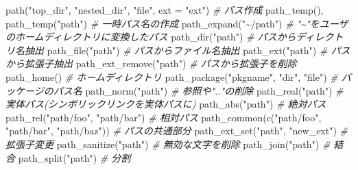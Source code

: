 \documentclass[
]{article}
\newenvironment{Shaded}{\begin{snugshade}}{\end{snugshade}}
\newcommand{\AttributeTok}[1]{\textcolor[rgb]{0.77,0.63,0.00}{#1}}
\newcommand{\CommentTok}[1]{\textcolor[rgb]{0.56,0.35,0.01}{\textit{#1}}}
\newcommand{\FunctionTok}[1]{\textcolor[rgb]{0.00,0.00,0.00}{#1}}
\newcommand{\NormalTok}[1]{#1}
\newcommand{\StringTok}[1]{\textcolor[rgb]{0.31,0.60,0.02}{#1}}
\begin{document}
\begin{Shaded}
\begin{Highlighting}[]
\FunctionTok{path}\NormalTok{(}\StringTok{"top\_dir"}\NormalTok{, }\StringTok{"nested\_dir"}\NormalTok{, }\StringTok{"file"}\NormalTok{, }\AttributeTok{ext =} \StringTok{"ext"}\NormalTok{)  }\CommentTok{\# パス作成   }
\FunctionTok{path\_temp}\NormalTok{(), }\FunctionTok{path\_temp}\NormalTok{(}\StringTok{"path"}\NormalTok{)                      }\CommentTok{\# 一時パス名の作成   }
\FunctionTok{path\_expand}\NormalTok{(}\StringTok{"\textasciitilde{}/path"}\NormalTok{)                               }\CommentTok{\# "\textasciitilde{}"をユーザのホームディレクトリに変換したパス   }
\FunctionTok{path\_dir}\NormalTok{(}\StringTok{"path"}\NormalTok{)                                    }\CommentTok{\# パスからディレクトリ名抽出   }
\FunctionTok{path\_file}\NormalTok{(}\StringTok{"path"}\NormalTok{)                                   }\CommentTok{\# パスからファイル名抽出   }
\FunctionTok{path\_ext}\NormalTok{(}\StringTok{"path"}\NormalTok{)                                    }\CommentTok{\# パスから拡張子抽出   }
\FunctionTok{path\_ext\_remove}\NormalTok{(}\StringTok{"path"}\NormalTok{)                             }\CommentTok{\# パスから拡張子を削除   }
\FunctionTok{path\_home}\NormalTok{()                                         }\CommentTok{\# ホームディレクトリ   }
\FunctionTok{path\_package}\NormalTok{(}\StringTok{"pkgname"}\NormalTok{, }\StringTok{"dir"}\NormalTok{, }\StringTok{"file"}\NormalTok{)              }\CommentTok{\# パッケージのパス名   }
\FunctionTok{path\_norm}\NormalTok{(}\StringTok{"path"}\NormalTok{)                                   }\CommentTok{\# 参照や".."の削除   }
\FunctionTok{path\_real}\NormalTok{(}\StringTok{"path"}\NormalTok{)                                   }\CommentTok{\# 実体パス(シンボリックリンクを実体パスに)   }
\FunctionTok{path\_abs}\NormalTok{(}\StringTok{"path"}\NormalTok{)                                    }\CommentTok{\# 絶対パス}
\FunctionTok{path\_rel}\NormalTok{(}\StringTok{"path/foo"}\NormalTok{, }\StringTok{"path/bar"}\NormalTok{)                    }\CommentTok{\# 相対パス}
\FunctionTok{path\_common}\NormalTok{(}\FunctionTok{c}\NormalTok{(}\StringTok{"path/foo"}\NormalTok{, }\StringTok{"path/bar"}\NormalTok{, }\StringTok{"path/baz"}\NormalTok{))  }\CommentTok{\# パスの共通部分   }
\FunctionTok{path\_ext\_set}\NormalTok{(}\StringTok{"path"}\NormalTok{, }\StringTok{"new\_ext"}\NormalTok{)                     }\CommentTok{\# 拡張子変更   }
\FunctionTok{path\_sanitize}\NormalTok{(}\StringTok{"path"}\NormalTok{)                               }\CommentTok{\# 無効な文字を削除   }
\FunctionTok{path\_join}\NormalTok{(}\StringTok{"path"}\NormalTok{)                                   }\CommentTok{\# 結合}
\FunctionTok{path\_split}\NormalTok{(}\StringTok{"path"}\NormalTok{)                                  }\CommentTok{\# 分割}
\end{Highlighting}
\end{Shaded}
\end{document}
